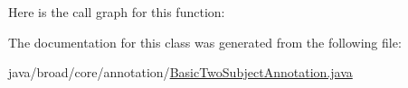 Here is the call graph for this function\+:




The documentation for this class was generated from the following file\+:\begin{DoxyCompactItemize}
\item 
java/broad/core/annotation/\hyperlink{_basic_two_subject_annotation_8java}{Basic\+Two\+Subject\+Annotation.\+java}\end{DoxyCompactItemize}
